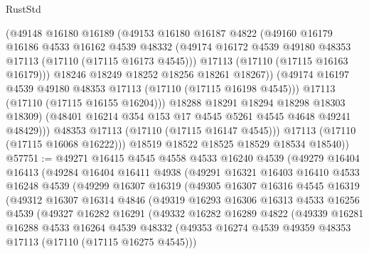 \begin{lexlean}{RustStd}
\begin{coremodule}
                    (@49148
                      @16180
                      @16189
                      (@49153
                        @16180
                        @16187
                        @4822
                        (@49160
                          @16179
                          @16186
                          @4533
                          @16162
                          @4539
                          @48332
                          (@49174 @16172 @4539 @49180 @48353 @17113 (@17110 (@17115 @16173 @4545)))
                          @17113
                          (@17110 (@17115 @16163 @16179)))
                        @18246
                        @18249
                        @18252
                        @18256
                        @18261
                        @18267))
                    (@49174 @16197 @4539 @49180 @48353 @17113 (@17110 (@17115 @16198 @4545)))
                    @17113
                    (@17110 (@17115 @16155 @16204)))
                  @18288
                  @18291
                  @18294
                  @18298
                  @18303
                  @18309)
                (@48401 @16214 @354 @153 @17 @4545 @5261 @4545 @4648 @49241 @48429)))
            @48353
            @17113
            (@17110 (@17115 @16147 @4545)))
          @17113
          (@17110 (@17115 @16068 @16222)))
        @18519
        @18522
        @18525
        @18529
        @18534
        @18540))
@57751 := @49271
    @16415
    @4545
    @4558
    @4533
    @16240
    @4539
    (@49279
      @16404
      @16413
      (@49284
        @16404
        @16411
        @4938
        (@49291
          @16321
          @16403
          @16410
          @4533
          @16248
          @4539
          (@49299
            @16307
            @16319
            (@49305
              @16307
              @16316
              @4545
              @16319
              (@49312
                @16307
                @16314
                @4846
                (@49319
                  @16293
                  @16306
                  @16313
                  @4533
                  @16256
                  @4539
                  (@49327
                    @16282
                    @16291
                    (@49332
                      @16282
                      @16289
                      @4822
                      (@49339
                        @16281
                        @16288
                        @4533
                        @16264
                        @4539
                        @48332
                        (@49353 @16274 @4539 @49359 @48353 @17113 (@17110 (@17115 @16275 @4545)))

\end{coremodule}
\end{lexlean}
